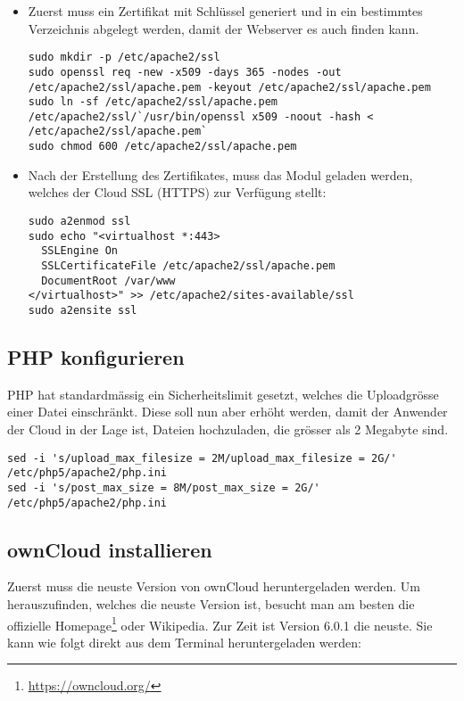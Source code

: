 \begin{itemize}
  \item Zuerst muss ein Zertifikat mit Schlüssel generiert und in ein bestimmtes Verzeichnis abgelegt werden, damit der Webserver es auch finden kann.
    \begin{lstlisting}
sudo mkdir -p /etc/apache2/ssl
sudo openssl req -new -x509 -days 365 -nodes -out /etc/apache2/ssl/apache.pem -keyout /etc/apache2/ssl/apache.pem
sudo ln -sf /etc/apache2/ssl/apache.pem /etc/apache2/ssl/`/usr/bin/openssl x509 -noout -hash < /etc/apache2/ssl/apache.pem`
sudo chmod 600 /etc/apache2/ssl/apache.pem
    \end{lstlisting}
  \item Nach der Erstellung des Zertifikates, muss das Modul geladen werden, welches der Cloud SSL (HTTPS) zur Verfügung stellt:
    \begin{lstlisting}
sudo a2enmod ssl
sudo echo "<virtualhost *:443>
  SSLEngine On
  SSLCertificateFile /etc/apache2/ssl/apache.pem
  DocumentRoot /var/www
</virtualhost>" >> /etc/apache2/sites-available/ssl
sudo a2ensite ssl
    \end{lstlisting}
\end{itemize}

\subsection{PHP konfigurieren}
PHP hat standardmässig ein Sicherheitslimit gesetzt, welches die Uploadgrösse einer Datei einschränkt. Diese soll nun aber erhöht werden, damit der Anwender der Cloud in der Lage ist, Dateien hochzuladen, die grösser als 2 Megabyte sind.

\begin{lstlisting}
sed -i 's/upload_max_filesize = 2M/upload_max_filesize = 2G/' /etc/php5/apache2/php.ini
sed -i 's/post_max_size = 8M/post_max_size = 2G/' /etc/php5/apache2/php.ini
\end{lstlisting}

\subsection{ownCloud installieren}
Zuerst muss die neuste Version von ownCloud heruntergeladen werden. Um herauszufinden, welches die neuste Version ist, besucht man am besten die offizielle Homepage\footnote{\url{https://owncloud.org/}} oder Wikipedia. Zur Zeit ist Version 6.0.1 die neuste. Sie kann wie folgt direkt aus dem Terminal heruntergeladen werden:

